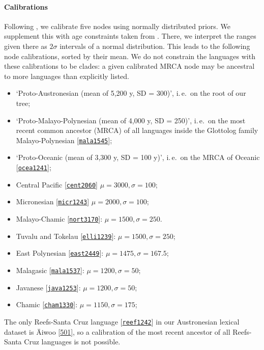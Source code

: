\documentclass[a4paper,12pt]{scrartcl}
\newcommand{\glot}[2]{#1 {\scriptsize{[\texttt{\href{https://glottolog.org/resource/languoid/id/#2}{#2}}]}}}
\begin{document}
\paragraph{Calibrations}
\newcommand{\abvd}[2]{#1 [\href{https://abvd.shh.mpg.de/austronesian/language.php?id=#2}{#2}]}
Following \textcite{greenhill2017evolutionary}, we calibrate five nodes using normally
distributed priors. We supplement this with age constraints taken from \textcite[Table S3]{gray2009language}. There, we interpret the ranges given there as $2\sigma$ intervals of a normal distribution. This leads to the following node calibrations, sorted by their mean. We do not constrain the languages with these calibrations to be clades: a given calibrated MRCA node may be ancestral to more languages than explicitly listed.
\begin{itemize}
\item ‘Proto-Austronesian (mean of 5,200 y, SD = 300)’, i.\,e.\ on the root of our tree;
\item ‘Proto-Malayo-Polynesian (mean of 4,000 y, SD = 250)’, i.\,e.\ on the most recent common ancestor (MRCA) of all languages inside the Glottolog family \glot{Malayo-Polynesian}{mala1545};
\item ‘Proto-Oceanic (mean of 3,300 y, SD = 100 y)’, i.\,e.\ on the MRCA of \glot{Oceanic}{ocea1241};
\item \glot{Central Pacific}{cent2060} $\mu=3000, \sigma=100$;
\item \glot{Micronesian}{micr1243} $\mu=2000, \sigma=100$;
\item \glot{Malayo-Chamic}{nort3170}: $\mu=1500, \sigma=250$.
\item \glot{Tuvalu and Tokelau}{elli1239}: $\mu=1500, \sigma=250$;
\item \glot{East Polynesian}{east2449}: $\mu=1475, \sigma=167.5$; 
\item \glot{Malagasic}{mala1537}: $\mu=1200, \sigma=50$;
\item \glot{Javanese}{java1253}: $\mu=1200, \sigma=50$;
\item \glot{Chamic}{cham1330}: $\mu=1150, \sigma=175$;
\end{itemize}
The only \glot{Reefs-Santa Cruz language}{reef1242} in our Austronesian lexical dataset is \abvd{Äiwoo}{501}, so a calibration of the most recent ancestor of all Reefs-Santa Cruz languages is not possible.
\end{document}
